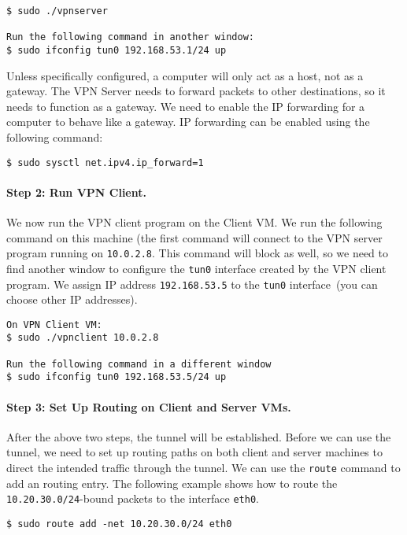 \begin{lstlisting}
$ sudo ./vpnserver

Run the following command in another window:
$ sudo ifconfig tun0 192.168.53.1/24 up
\end{lstlisting}

Unless specifically configured, a computer will only act as a host,
not as a gateway. The VPN Server needs to forward packets to other destinations,
so it needs to function as a gateway. We need to
enable the IP forwarding for a computer to behave like a gateway.
IP forwarding can be enabled
using the following command:

\begin{lstlisting}
$ sudo sysctl net.ipv4.ip_forward=1
\end{lstlisting}



\paragraph{Step 2: Run VPN Client.} 
We now run the VPN client program on the Client
VM.  We run the following command on this machine (the first command
will connect to the VPN server program running on {\tt 10.0.2.8}.
This command will block as well, so we need to find another window to
configure the \texttt{tun0} interface created by the VPN client program.
We assign IP address \texttt{192.168.53.5} to the \texttt{tun0} interface~(you
can choose other IP addresses).


\begin{lstlisting}
On VPN Client VM:
$ sudo ./vpnclient 10.0.2.8

Run the following command in a different window
$ sudo ifconfig tun0 192.168.53.5/24 up
\end{lstlisting}



\paragraph{Step 3: Set Up Routing on Client and Server VMs.}
After the above two steps, the tunnel will be established.
Before we can use the tunnel, we need to set up routing
paths on both client and server machines to direct the intended traffic through
the tunnel. 
We can use the \texttt{route} command to add an routing entry. The
following example shows how to route the \texttt{10.20.30.0/24}-bound
packets to the interface \texttt{eth0}.

\begin{lstlisting}
$ sudo route add -net 10.20.30.0/24 eth0
\end{lstlisting}

